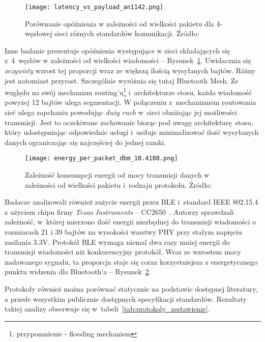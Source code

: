 \begin{figure}[!ht]
	\centering \texttt{[image: latency\_vs\_payload\_an1142.png]} 
	\caption{Porównanie opóźnienia w zależności od wielkości pakietu dla 4-węzłowej sieci różnych standardów komunikacji. Źródło: \cite{noauthor_an1142_nodate}}
	\label{rys:latency_vs_payload_an1142}
\end{figure}

Inne badanie prezentuje opóźnienia występujące w sieci składających się z~4~węzłów w zależności od wielkości
wiadomości -- Rysunek~\ref{rys:latency_vs_payload_an1142}. Uwidacznia się \textit{oczywisty}
wzrost tej proporcji wraz ze większą ilością wysyłanych bajtów. Różny jest natomiast przyrost. Szczególnie wyróżnia się
tutaj Bluetooth Mesh. Ze względu na swój mechanizm routing'u\footnote{przypomnienie - flooding mechanism}
i~architekturze stosu, każda wiadomość powyżej 12 bajtów ulega segmentacji. W połączeniu z~mechanizmem routowania
sieć ulega zapchaniu powodując \textit{duży ruch} w~sieci obniżając jej możliwości transmisji. Jest to oczekiwane 
zachowanie biorąc pod uwagę architekturę stosu, który udostępniając odpowiednie usługi i~usiłuje minimalizować
ilość wysyłanych danych ograniczając się najczęściej do jednej ramki.%

\begin{figure}[!ht]
	\centering \texttt{[image: energy\_per\_packet\_dbm\_10.4108.png]} 
	\caption{Zależność konsumpcji energii od mocy transmisji danych w zależności od wielkości pakietu i~rodzaju protokołu. Źródło: \cite{fafoutis_ble_2016}}
	\label{rys:energy_per_packet_dbm_10.4108}
\end{figure}

Badacze analizowali również zużycie energii przez \gls{BLE} i~standard IEEE 802.15.4 z użyciem chipu
firmy \textit{Texas Instruments} -- CC2650~\cite{fafoutis_ble_2016}. Autorzy sprawdzali zależność, w~której
mierzono ilość energii niezbędnej do transmisji wiadomości o rozmiarach 21 i 39 bajtów na wysokości warstwy PHY przy
stałym napięciu zasilania 3.3V. Protokół BLE wymaga niemal dwa razy mniej energii do transmisji wiadomości
niż konkurencyjny protokół. Wraz ze wzrostem mocy nadawanego sygnału, ta proporcja staje się coraz korzystniejsza
z energetycznego punktu widzenia dla Bluetooth'a -- Rysunek~\ref{rys:energy_per_packet_dbm_10.4108}.

Protokoły również można porównać statycznie na podstawie dostępnej literatury, a przede wszystkim
publicznie dostępnych specyfikacji standardów. Rezultaty takiej analizy obserwuje się w~tabeli~\ref{tab:protokoly_zestawienie}.

